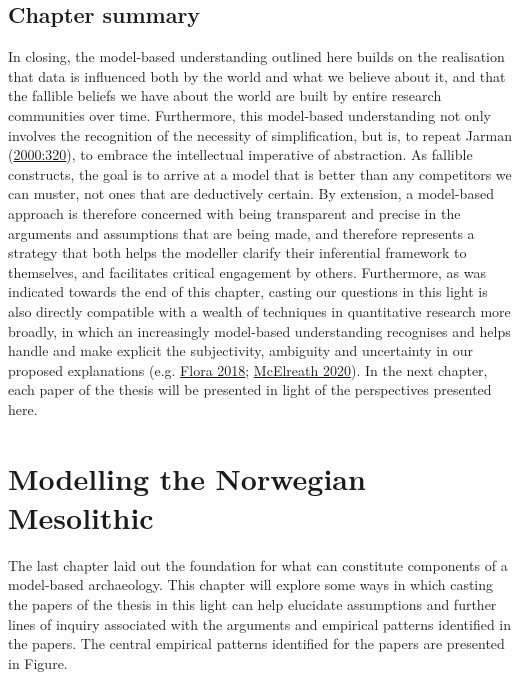 \documentclass[
  12pt,
  a4paper,
  oneside]{book}
\begin{document}
\hypertarget{chapter-summary-2}{%
\section{Chapter summary}\label{chapter-summary-2}}

In closing, the model-based understanding outlined here builds on the realisation that data is influenced both by the world and what we believe about it, and that the fallible beliefs we have about the world are built by entire research communities over time. Furthermore, this model-based understanding not only involves the recognition of the necessity of simplification, but is, to repeat Jarman (\protect\hyperlink{ref-jarman2000}{2000:320}), to \textquotesingle embrace the intellectual imperative of abstraction\textquotesingle. As fallible constructs, the goal is to arrive at a model that is better than any competitors we can muster, not ones that are deductively certain. By extension, a model-based approach is therefore concerned with being transparent and precise in the arguments and assumptions that are being made, and therefore represents a strategy that both helps the modeller clarify their inferential framework to themselves, and facilitates critical engagement by others. Furthermore, as was indicated towards the end of this chapter, casting our questions in this light is also directly compatible with a wealth of techniques in quantitative research more broadly, in which an increasingly model-based understanding recognises and helps handle and make explicit the subjectivity, ambiguity and uncertainty in our proposed explanations (e.g. \protect\hyperlink{ref-flora2018}{Flora 2018}; \protect\hyperlink{ref-mcelreath2020}{McElreath 2020}). In the next chapter, each paper of the thesis will be presented in light of the perspectives presented here.

\hypertarget{modelling-the-norwegian-mesolithic}{%
\chapter{Modelling the Norwegian Mesolithic}\label{modelling-the-norwegian-mesolithic}}

The last chapter laid out the foundation for what can constitute components of a model-based archaeology. This chapter will explore some ways in which casting the papers of the thesis in this light can help elucidate assumptions and further lines of inquiry associated with the arguments and empirical patterns identified in the papers. The central empirical patterns identified for the papers are presented in Figure.
\end{document}
